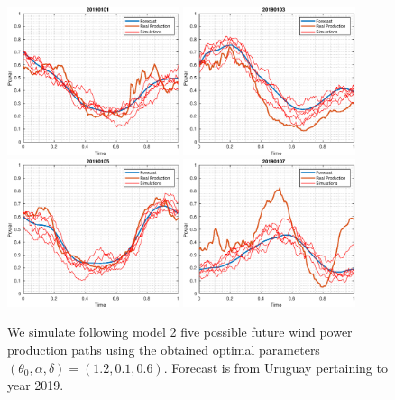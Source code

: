 \documentclass[11pt]{article}
\theoremstyle{definition}
\begin{document}
\begin{figure}[H]
\centering
\includegraphics[width=0.45\textwidth]{plots/paths_testing_days/1.eps}
\includegraphics[width=0.45\textwidth]{plots/paths_testing_days/2.eps}\\
\includegraphics[width=0.45\textwidth]{plots/paths_testing_days/3.eps}
\includegraphics[width=0.45\textwidth]{plots/paths_testing_days/4.eps}
\caption{We simulate following model 2  five possible future wind power production paths using the obtained optimal parameters $(\theta_0, \alpha ,\delta)=(1.2,0.1,0.6)$. Forecast is from Uruguay pertaining to  year 2019.}
\end{figure}
\end{document}
